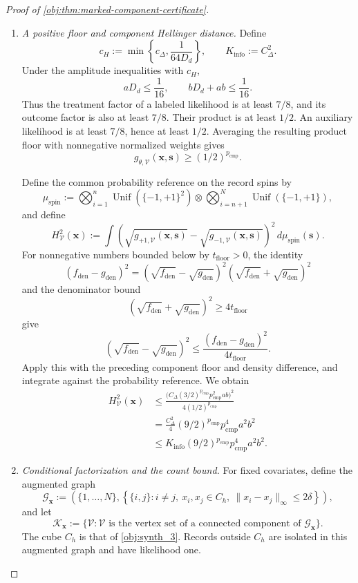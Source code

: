 \begin{proof}[Proof of \cref{obj:thm:marked-component-certificate}]
\begin{enumerate}
\item \textit{A positive floor and component Hellinger distance.}
Define
\[
c_H:=\min\left\{c_\Delta,\frac1{64D_d}\right\},
\qquad
K_{\mathrm{info}}:=C_\Delta^2.
\]
Under the amplitude inequalities with \(c_H\),
\[
aD_d\le\frac1{16},
\qquad
bD_d+ab\le\frac1{16}.
\]
Thus the treatment factor of a labeled likelihood is at least \(7/8\), and its outcome factor is also at least \(7/8\). Their product is at least \(1/2\). An auxiliary likelihood is at least \(7/8\), hence at least \(1/2\). Averaging the resulting product floor with nonnegative normalized weights gives
\[
g_{\theta,\mathcal V}(\mathbf x,\mathbf s)
\ge(1/2)^{p_{\mathrm{cmp}}}.
\]

Define the common probability reference on the record spins by
\[
\mu_{\mathrm{spin}}
:=
\bigotimes_{i=1}^{n}\operatorname{Unif}(\{-1,+1\}^2)
\otimes
\bigotimes_{i=n+1}^{N}\operatorname{Unif}(\{-1,+1\}),
\]
and define
\[
H_{\mathcal V}^2(\mathbf x)
:=
\int
\left(
\sqrt{g_{+1,\mathcal V}(\mathbf x,\mathbf s)}
-\sqrt{g_{-1,\mathcal V}(\mathbf x,\mathbf s)}
\right)^2
\,d\mu_{\mathrm{spin}}(\mathbf s).
\]
For nonnegative numbers bounded below by \(t_{\mathrm{floor}}>0\), the identity
\[
(f_{\mathrm{den}}-g_{\mathrm{den}})^2
=
(\sqrt{f_{\mathrm{den}}}-\sqrt{g_{\mathrm{den}}})^2
(\sqrt{f_{\mathrm{den}}}+\sqrt{g_{\mathrm{den}}})^2
\]
and the denominator bound
\[
(\sqrt{f_{\mathrm{den}}}+\sqrt{g_{\mathrm{den}}})^2
\ge4t_{\mathrm{floor}}
\]
give
\[
(\sqrt{f_{\mathrm{den}}}-\sqrt{g_{\mathrm{den}}})^2
\le
\frac{(f_{\mathrm{den}}-g_{\mathrm{den}})^2}{4t_{\mathrm{floor}}}.
\]
Apply this with the preceding component floor and density difference, and integrate against the probability reference. We obtain
\[
\begin{aligned}
H_{\mathcal V}^2(\mathbf x)
&\le
\frac{
\bigl(C_\Delta(3/2)^{p_{\mathrm{cmp}}}
p_{\mathrm{cmp}}^2ab\bigr)^2
}{
4(1/2)^{p_{\mathrm{cmp}}}
}\\
&=
\frac{C_\Delta^2}{4}(9/2)^{p_{\mathrm{cmp}}}
p_{\mathrm{cmp}}^4a^2b^2\\
&\le
K_{\mathrm{info}}(9/2)^{p_{\mathrm{cmp}}}
p_{\mathrm{cmp}}^4a^2b^2.
\end{aligned}
\]

\item \textit{Conditional factorization and the count bound.}
For fixed covariates, define the augmented graph
\[
\mathscr G_{\mathbf x}
:=
\left(
\{1,\ldots,N\},
\left\{\{i,j\}:
i\ne j,\ x_i,x_j\in C_h,\
\|x_i-x_j\|_\infty\le2\delta
\right\}
\right),
\]
and let
\[
\mathscr K_{\mathbf x}
:=
\{\mathcal V:\mathcal V
\text{ is the vertex set of a connected component of }
\mathscr G_{\mathbf x}\}.
\]
The cube \(C_h\) is that of \cref{obj:synth_3}. Records outside \(C_h\) are isolated in this augmented graph and have likelihood one.


\end{enumerate}
\end{proof}
